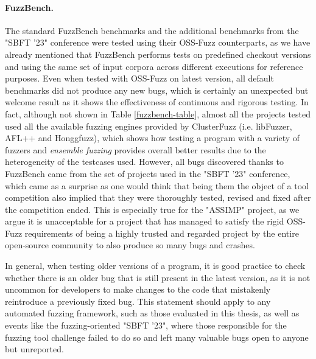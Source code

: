 \paragraph{FuzzBench.} The standard FuzzBench benchmarks and the additional benchmarks from the "SBFT '23" conference were tested using their OSS-Fuzz counterparts, as we have already mentioned that FuzzBench performs tests on predefined checkout versions and using the same set of input corpora across different executions for reference purposes. Even when tested with OSS-Fuzz on latest version, all default benchmarks did not produce any new bugs, which is certainly an unexpected but welcome result as it shows the effectiveness of continuous and rigorous testing. In fact, although not shown in Table \ref{fuzzbench-table}, almost all the projects tested used all the available fuzzing engines provided by ClusterFuzz (i.e. libFuzzer, AFL++ and Honggfuzz), which shows how testing a program with a variety of fuzzers and \textit{ensemble fuzzing} provides overall better results due to the heterogeneity of the testcases used. However, all bugs discovered thanks to FuzzBench came from the set of projects used in the "SBFT '23" conference, which came as a surprise as one would think that being them the object of a tool competition also implied that they were thoroughly tested, revised and fixed after the competition ended. This is especially true for the "ASSIMP" project, as we argue it is unacceptable for a project that has managed to satisfy the rigid OSS-Fuzz requirements of being a highly trusted and regarded project by the entire open-source community to also produce so many bugs and crashes.

In general, when testing older versions of a program, it is good practice to check whether there is an older bug that is still present in the latest version, as it is not uncommon for developers to make changes to the code that mistakenly reintroduce a previously fixed bug. This statement should apply to any automated fuzzing framework, such as those evaluated in this thesis, as well as events like the fuzzing-oriented "SBFT '23", where those responsible for the fuzzing tool challenge failed to do so and left many valuable bugs open to anyone but unreported. 